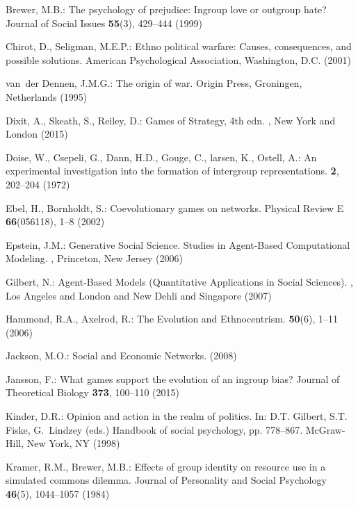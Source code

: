\begin{thebibliography}{10}
	Brewer, M.B.: The psychology of prejudice: Ingroup love or outgroup hate?
	\newblock Journal of Social Issues \textbf{55}(3), 429--444 (1999)
	
	Chirot, D., Seligman, M.E.P.: Ethno political warfare: Causes, consequences,
	and possible solutions.
	\newblock American Psychological Association, Washington, D.C. (2001)
	
	van~der Dennen, J.M.G.: The origin of war.
	\newblock Origin Press, Groningen, Netherlands (1995)
	
	Dixit, A., Skeath, S., Reiley, D.: {Games of Strategy}, 4th edn.
	, {New York and London} (2015)
	
	Doise, W., Csepeli, G., Dann, H.D., Gouge, C., larsen, K., Ostell, A.: An
	experimental investigation into the formation of intergroup representations.
	 \textbf{2}, 202--204 (1972)
	
	Ebel, H., Bornholdt, S.: Coevolutionary games on networks.
	\newblock Physical Review E \textbf{66}(056118), 1--8 (2002)
	
	Epstein, J.M.: {Generative Social Science. Studies in Agent-Based Computational
		Modeling}.
	, Princeton, New Jersey (2006)
	
	Gilbert, N.: {Agent-Based Models (Quantitative Applications in Social
		Sciences)}.
	, Los Angeles and London and New Dehli and
	Singapore (2007)
	
	Hammond, R.A., Axelrod, R.: {The Evolution and Ethnocentrism}.
	 \textbf{50}(6), 1--11 (2006)
	
	Jackson, M.O.: {Social and Economic Networks}.
	 (2008)
	
	Jansson, F.: {What games support the evolution of an ingroup bias?}
	\newblock Journal of Theoretical Biology \textbf{373}, 100--110 (2015)
	
	Kinder, D.R.: Opinion and action in the realm of politics.
	\newblock In: D.T. Gilbert, S.T. Fiske, G.~Lindzey (eds.) Handbook of social
	psychology, pp. 778--867. McGraw-Hill, New York, NY (1998)
	
	Kramer, R.M., Brewer, M.B.: Effects of group identity on resource use in a
	simulated commons dilemma.
	\newblock Journal of Personality and Social Psychology \textbf{46}(5),
	1044--1057 (1984)
	

\end{thebibliography}
